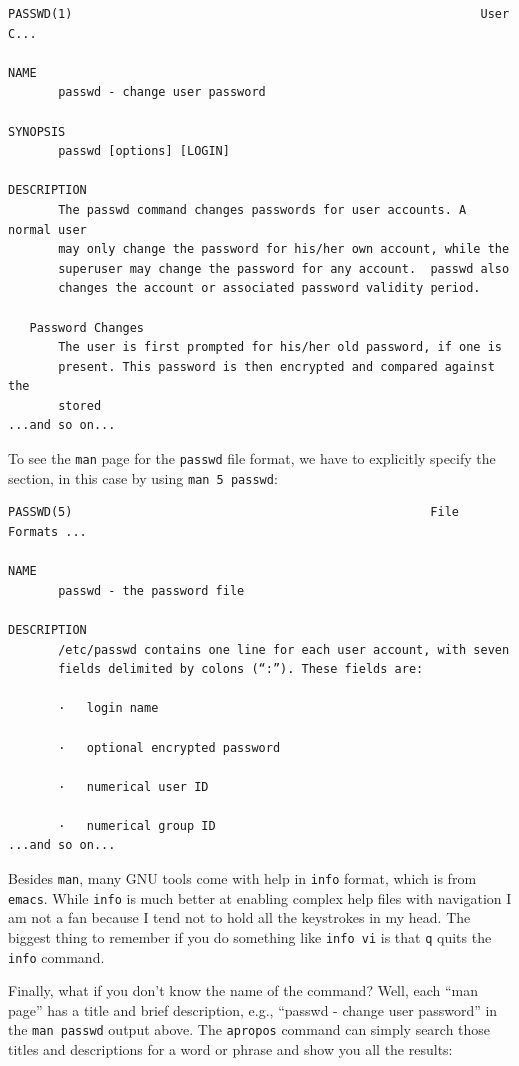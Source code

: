 \documentclass[10pt,]{book}
\numberwithin{figure}{chapter}
\begin{document}
\begin{verbatim}
PASSWD(1)                                                         User C...

NAME
       passwd - change user password

SYNOPSIS
       passwd [options] [LOGIN]

DESCRIPTION
       The passwd command changes passwords for user accounts. A normal user
       may only change the password for his/her own account, while the
       superuser may change the password for any account.  passwd also
       changes the account or associated password validity period.

   Password Changes
       The user is first prompted for his/her old password, if one is
       present. This password is then encrypted and compared against the
       stored
...and so on...
\end{verbatim}

To see the \texttt{man} page for the \texttt{passwd} file format, we
have to explicitly specify the section, in this case by using
\texttt{man 5 passwd}:

\begin{verbatim}
PASSWD(5)                                                  File Formats ...

NAME
       passwd - the password file

DESCRIPTION
       /etc/passwd contains one line for each user account, with seven
       fields delimited by colons (“:”). These fields are:

       ·   login name

       ·   optional encrypted password

       ·   numerical user ID

       ·   numerical group ID
...and so on...
\end{verbatim}

Besides \texttt{man}, many GNU tools come with help in \texttt{info}
format, which is from \texttt{emacs}. While \texttt{info} is much better
at enabling complex help files with navigation I am not a fan because I
tend not to hold all the keystrokes in my head. The biggest thing to
remember if you do something like \texttt{info vi} is that \texttt{q}
quits the \texttt{info} command.

Finally, what if you don't know the name of the command? Well, each
``man page'' has a title and brief description, e.g., ``passwd - change
user password'' in the \texttt{man passwd} output above. The
\texttt{apropos} command can simply search those titles and descriptions
for a word or phrase and show you all the results:
\end{document}
